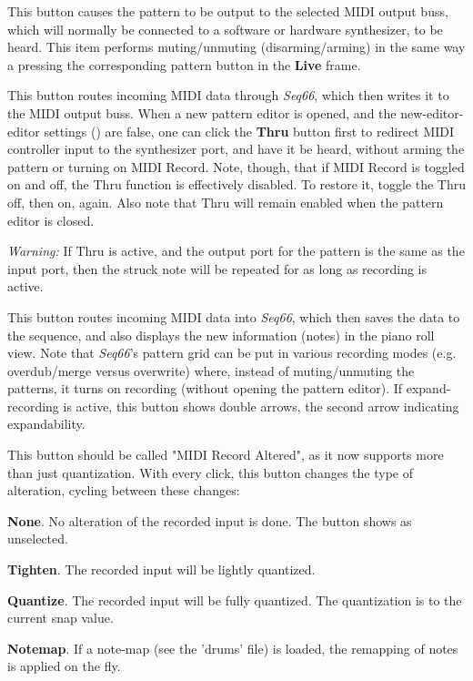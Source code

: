    This button causes the pattern to be output to the
   selected MIDI output buss,
   which will normally be connected to a software or hardware
   synthesizer, to be heard.
   This item performs muting/unmuting (disarming/arming) in the same way a
   pressing the corresponding pattern button in the \textbf{Live} frame.

   This button routes incoming MIDI data through
   \textsl{Seq66}, which then writes it to the MIDI output buss.
   When a new pattern editor is opened,
   and the new-editor-editor settings
   ()
   are false, one can click the
   \textbf{Thru} button first to redirect MIDI controller input
   to the synthesizer port, and have it be heard, without
   arming the pattern or turning on MIDI Record.
   Note, though, that if MIDI Record is toggled on and off, the
   Thru function is effectively disabled.  To restore it,
   toggle the Thru off, then on, again.
   Also note that Thru will remain enabled when the pattern editor is closed.

   \textsl{Warning:}
   If Thru is active, and the output port for the pattern is the
   same as the input port, then the struck note will be repeated
   for as long as recording is active.

   This button routes incoming MIDI data into
   \textsl{Seq66}, which then saves the data to the sequence, and also
   displays the new information (notes) in the piano roll view.
   Note that \textsl{Seq66}'s pattern grid can be put in various recording
   modes (e.g. overdub/merge versus overwrite) where, instead of
   muting/unmuting the patterns, it turns on recording (without opening the
   pattern editor).
   If expand-recording is active, this button shows double arrows, the
   second arrow indicating expandability.

   This button should be called "MIDI Record Altered", as it now supports
   more than just quantization.
   With every click, this button changes the type of alteration, cycling
   between these changes:

   \begin{enumber}
      \item \textbf{None}.
         No alteration of the recorded input is done.
         The button shows as unselected.
      \item \textbf{Tighten}.
         The recorded input will be lightly quantized.
      \item \textbf{Quantize}.
         The recorded input will be fully quantized.
         The quantization is to the current snap value.
      \item \textbf{Notemap}.
         If a note-map (see the 'drums' file) is loaded, the remapping of notes
         is applied on the fly.
   \end{enumber}

